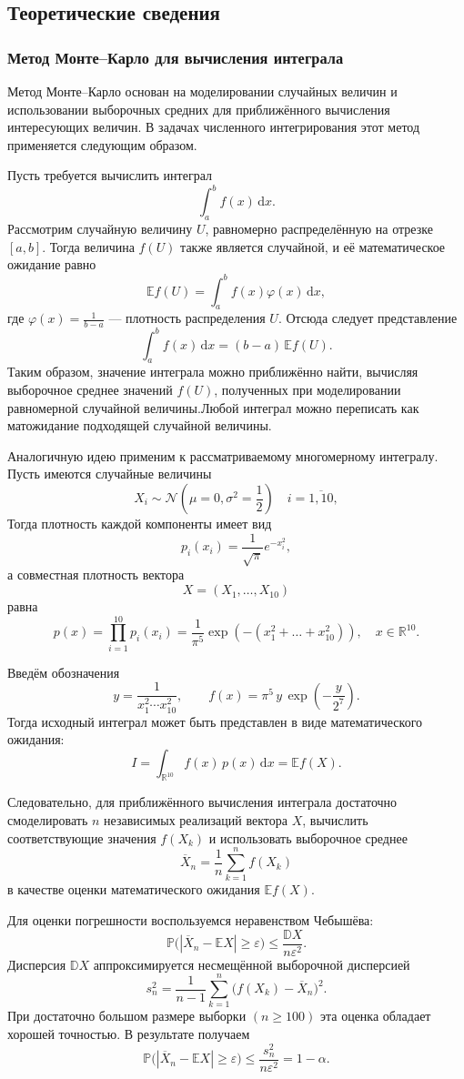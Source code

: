 \documentclass[11pt]{article}
\renewcommand{\le}{\leqslant}
\renewcommand{\ge}{\geqslant}
\begin{document}
\subsection{Теоретические сведения}
\subsubsection{Метод Монте–Карло для вычисления интеграла}

Метод Монте–Карло основан на моделировании случайных величин и использовании выборочных средних для приближённого вычисления интересующих величин. В задачах численного интегрирования этот метод применяется следующим образом.

Пусть требуется вычислить интеграл
$$
\int_a^b f(x)\,\mathrm dx.
$$
Рассмотрим случайную величину $U$, равномерно распределённую на отрезке $[a,b]$. Тогда величина $f(U)$ также является случайной, и её математическое ожидание равно
$$
\mathbb E f(U)=\int_a^b f(x)\varphi(x)\,\mathrm dx,
$$
где $\varphi(x)=\frac{1}{b-a}$ — плотность распределения $U$.
Отсюда следует представление
$$
\int_a^b f(x)\,\mathrm dx=(b-a)\,\mathbb E f(U).
$$
Таким образом, значение интеграла можно приближённо найти, вычисляя выборочное среднее значений $f(U)$, полученных при моделировании равномерной случайной величины.Любой интеграл можно переписать как матожидание подходящей случайной величины.

Аналогичную идею применим к рассматриваемому многомерному интегралу. Пусть имеются случайные величины
$$
X_i\sim\mathcal{N(\mu=0,\sigma^2=\frac{1}{2})}\quad i=\overline{1,10},
$$
Тогда плотность каждой компоненты имеет вид
$$
p_i(x_i)=\frac{1}{\sqrt{\pi}}e^{-x_i^2},
$$
а совместная плотность вектора
$$
X=(X_1,\dots,X_{10})
$$
равна
$$
p(x)=\prod_{i=1}^{10}p_i(x_i)
=\frac{1}{\pi^5}\exp\!\left(-(x_1^2+\dots+x_{10}^2)\right),
\quad x\in\mathbb R^{10}.
$$

Введём обозначения
$$
y=\frac{1}{x_1^2\cdots x_{10}^2},
\qquad
f(x)=\pi^5\,y\,\exp\!\left(-\frac{y}{2^7}\right).
$$
Тогда исходный интеграл может быть представлен в виде математического ожидания:
$$
I=\int_{\mathbb R^{10}} f(x)\,p(x)\,\mathrm dx=\mathbb E f(X).
$$

Следовательно, для приближённого вычисления интеграла достаточно смоделировать $n$ независимых реализаций вектора $X$, вычислить соответствующие значения $f(X_k)$ и использовать выборочное среднее
$$
\overline X_n=\frac{1}{n}\sum_{k=1}^n f(X_k)
$$
в качестве оценки математического ожидания $\mathbb E f(X)$.

Для оценки погрешности воспользуемся неравенством Чебышёва:
$$
\mathbb P\bigl(|\overline X_n-\mathbb E X|\ge\varepsilon\bigr)
\le
\frac{\mathbb D X}{n\varepsilon^2}.
$$
Дисперсия $\mathbb D X$ аппроксимируется несмещённой выборочной дисперсией
$$
s_n^2=\frac{1}{n-1}\sum_{k=1}^n\bigl(f(X_k)-\overline X_n\bigr)^2.
$$
При достаточно большом размере выборки $(n\ge100)$ эта оценка обладает хорошей точностью. В результате получаем
$$
\mathbb P\bigl(|\overline X_n-\mathbb E X|\ge\varepsilon\bigr)
\le
\frac{s_n^2}{n\varepsilon^2}
=1-\alpha.
$$
\end{document}
